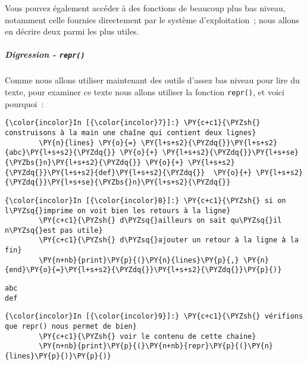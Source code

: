     Vous pouvez également accéder à des fonctions de beaucoup plus bas
niveau, notamment celle fournies directement par le système
d'exploitation~; nous allons en décrire deux parmi les plus utiles.

    \hypertarget{digression---repr}{%
\subparagraph{\texorpdfstring{Digression -
\texttt{repr()}}{Digression - repr()}}\label{digression---repr}}

    Comme nous allons utiliser maintenant des outils d'assez bas niveau pour
lire du texte, pour examiner ce texte nous allons utiliser la fonction
\texttt{repr()}, et voici pourquoi~:

    \begin{Verbatim}[commandchars=\\\{\},frame=single,framerule=0.3mm,rulecolor=\color{cellframecolor}]
{\color{incolor}In [{\color{incolor}7}]:} \PY{c+c1}{\PYZsh{} construisons à la main une chaîne qui contient deux lignes}
        \PY{n}{lines} \PY{o}{=} \PY{l+s+s2}{\PYZdq{}}\PY{l+s+s2}{abc}\PY{l+s+s2}{\PYZdq{}} \PY{o}{+} \PY{l+s+s2}{\PYZdq{}}\PY{l+s+se}{\PYZbs{}n}\PY{l+s+s2}{\PYZdq{}} \PY{o}{+} \PY{l+s+s2}{\PYZdq{}}\PY{l+s+s2}{def}\PY{l+s+s2}{\PYZdq{}}  \PY{o}{+} \PY{l+s+s2}{\PYZdq{}}\PY{l+s+se}{\PYZbs{}n}\PY{l+s+s2}{\PYZdq{}}
\end{Verbatim}


    \begin{Verbatim}[commandchars=\\\{\},frame=single,framerule=0.3mm,rulecolor=\color{cellframecolor}]
{\color{incolor}In [{\color{incolor}8}]:} \PY{c+c1}{\PYZsh{} si on l\PYZsq{}imprime on voit bien les retours à la ligne}
        \PY{c+c1}{\PYZsh{} d\PYZsq{}ailleurs on sait qu\PYZsq{}il n\PYZsq{}est pas utile}
        \PY{c+c1}{\PYZsh{} d\PYZsq{}ajouter un retour à la ligne à la fin}
        \PY{n+nb}{print}\PY{p}{(}\PY{n}{lines}\PY{p}{,} \PY{n}{end}\PY{o}{=}\PY{l+s+s2}{\PYZdq{}}\PY{l+s+s2}{\PYZdq{}}\PY{p}{)}
\end{Verbatim}


    \begin{Verbatim}[commandchars=\\\{\},frame=single,framerule=0.3mm,rulecolor=\color{cellframecolor}]
abc
def
\end{Verbatim}

    \begin{Verbatim}[commandchars=\\\{\},frame=single,framerule=0.3mm,rulecolor=\color{cellframecolor}]
{\color{incolor}In [{\color{incolor}9}]:} \PY{c+c1}{\PYZsh{} vérifions que repr() nous permet de bien}
        \PY{c+c1}{\PYZsh{} voir le contenu de cette chaine}
        \PY{n+nb}{print}\PY{p}{(}\PY{n+nb}{repr}\PY{p}{(}\PY{n}{lines}\PY{p}{)}\PY{p}{)}
\end{Verbatim}


